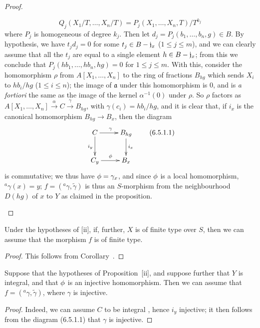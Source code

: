 \begin{proof}
\begin{enumerate}
    \[
      Q_j(X_1/T,\ldots,X_n/T)=P_j(X_1,\ldots,X_n,T)/T^{k_j}
    \]
    where $P_j$ is homogeneous of degree $k_j$.
    Then let $d_j=P_j(b_1,\ldots,b_n,g)\in B$.
    By hypothesis, we have $t_jd_j=0$ for some $t_j\in B-\mathfrak{j}_x$ ($1\leq j\leq m$), and we can clearly assume that all the $t_j$ are equal to a single element $h\in B-\mathfrak{j}_x$;
    from this we conclude that $P_j(hb_1,\ldots,hb_n,hg)=0$ for $1\leq j\leq m$.
    With this, consider the homomorphism $\rho$ from $A[X_1,\ldots,X_n]$ to the ring of fractions $B_{hg}$ which sends $X_i$ to $hb_i/hg$ ($1\leq i\leq n$);
    the image of $\mathfrak{a}$ under this homomorphism is $0$, and is \emph{a fortiori} the same as the image of the kernel $\alpha^{-1}(0)$ under $\rho$.
    So $\rho$ factors as $A[X_1,\ldots,X_n]\xrightarrow{\alpha}C\xrightarrow{\gamma}B_{hg}$, with $\gamma(c_i)=hb_i/hg$, and it is clear that, if $i_x$ is the canonical homomorphism $B_{hg}\to B_x$, then the diagram
    \[
    \label{I.6.5.1.1}
      \xymatrix{
        C\ar[r]^\gamma\ar[d]_{i_y} &
        B_{hg}\ar[d]^{i_x}\\
        C_y\ar[r]^\vphi &
        B_x
      }
      \tag{6.5.1.1}
    \]
    is commutative; we thus have $\phi=\gamma_x$, and since $\phi$ is a local homomorphism, $^a\gamma(x)=y$;
    $f=({}^a\gamma,\widetilde{\gamma})$ is thus an $S$-morphism from the neighbourhood $D(hg)$ of $x$ to $Y$ as claimed in the proposition.
\end{enumerate}
\end{proof}

\begin{corollary}[6.5.2]
\label{I.6.5.2}
Under the hypotheses of [ii], if, further, $X$ is of finite type over $S$, then we can assume that the morphism $f$ is of finite type.
\end{corollary}

\begin{proof}
\label{proof-1.6.5.2}
This follows from Corollary~.
\end{proof}

\begin{corollary}[6.5.3]
\label{I.6.5.3}
Suppose that the hypotheses of Proposition~[ii], and suppose further that $Y$ is integral, and that $\phi$ is an injective homomorphism.
Then we can assume that $f=({}^a\gamma,\widetilde{\gamma})$, where $\gamma$ is injective.
\end{corollary}

\begin{proof}
\label{proof-1.6.5.3}
Indeed, we can assume $C$ to be integral , hence $i_y$ injective; it then follows from the diagram (6.5.1.1) that $\gamma$ is injective.
\end{proof}


